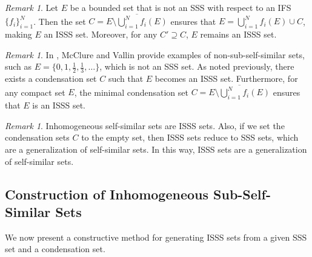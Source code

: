 \documentclass[12pt,oneside,reqno]{amsart}
\theoremstyle{definition}
\theoremstyle{remark}
\newtheorem{remark}[theorem]{Remark}
\begin{document}
\begin{remark}
Let $E$ be a bounded set that is not an SSS with respect to an IFS $\{f_i\}_{i=1}^N$. Then the set $C = \overline{E \setminus \bigcup_{i=1}^N f_i(E)}$ ensures that $E = \bigcup_{i=1}^N f_i(E) \cup C$, making $E$ an ISSS set. Moreover, for any $C' \supseteq C$, $E$ remains an ISSS set.
\end{remark}

\begin{remark}
In \cite{Mac}, McClure and Vallin provide examples of non-sub-self-similar sets, such as $E = \{0, 1, \frac{1}{2}, \frac{1}{3}, \ldots\}$, which is not an SSS set. As noted previously, there exists a condensation set $C$ such that $E$ becomes an ISSS set. Furthermore, for any compact set $E$, the minimal condensation set $C = \overline{E \setminus \bigcup_{i=1}^N f_i(E)}$ ensures that $E$ is an ISSS set.
\end{remark}
\begin{remark}
    Inhomogeneous self-similar sets are ISSS sets. Also, if we set the condensation sets $C$ to the empty set, then ISSS sets reduce to SSS sets, which are a generalization of self-similar sets. In this way, ISSS sets are a generalization of self-similar sets.
\end{remark}
\subsection{Construction of Inhomogeneous Sub-Self-Similar Sets}

We now present a constructive method for generating ISSS sets from a given SSS set and a condensation set.
\end{document}
